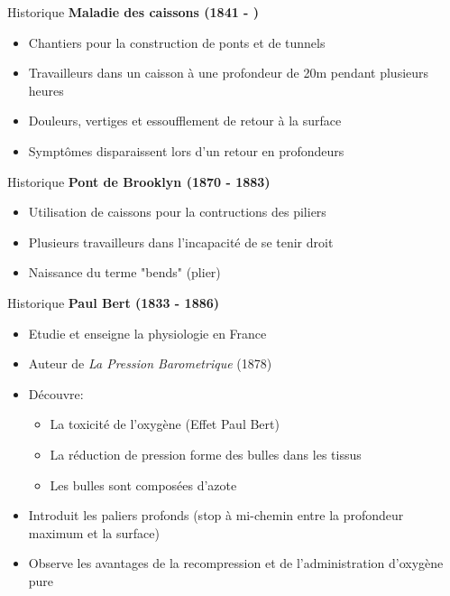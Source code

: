 \begin{frame}{Historique}  
	\textbf{Maladie des caissons (1841 - )}
	\begin{itemize}
		\item Chantiers pour la construction de ponts et de tunnels
		\item Travailleurs dans un caisson à une profondeur de 20m pendant plusieurs heures
		\item Douleurs, vertiges et essoufflement de retour à la surface
		\item Symptômes disparaissent lors d'un retour en profondeurs
	\end{itemize}
\end{frame}

\begin{frame}{Historique}  
	\textbf{Pont de Brooklyn (1870 - 1883)}
	\begin{itemize}
		\item Utilisation de caissons pour la contructions des piliers
		\item Plusieurs travailleurs dans l'incapacité de se tenir droit
		\item Naissance du terme "bends" (plier)
	\end{itemize}
\end{frame}

\begin{frame}{Historique}  
	\textbf{Paul Bert (1833 - 1886)}
	\begin{itemize}
		\item Etudie et enseigne la physiologie en France
		\item Auteur de \textit{La Pression Barometrique} (1878)
		\item Découvre:
		\begin{itemize}
			\item La toxicité de l'oxygène (Effet Paul Bert)
			\item La réduction de pression forme des bulles dans les tissus
			\item Les bulles sont composées d'azote
		\end{itemize}
		\item Introduit les paliers profonds (stop à mi-chemin entre la profondeur maximum et la surface)
		\item Observe les avantages de la recompression et de l'administration d'oxygène pure
	\end{itemize}
\end{frame}

